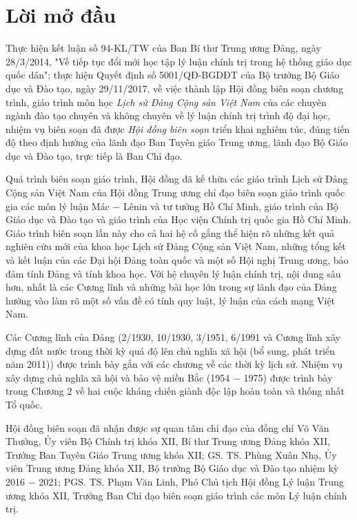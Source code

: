 \section*{Lời mở đầu}
Thực hiện kết luận số 94-KL/TW của Ban Bí thư Trung ương Đảng, ngày 28/3/2014, "Về tiếp tục đổi mới học tập lý luận chính trị trong hệ thống giáo dục quốc dân"; thực hiện Quyết định số 5001/QĐ-BGDĐT của Bộ trưởng Bộ Giáo dục và Đào tạo, ngày 29/11/2017, về việc thành lập Hội đồng biên soạn chương trình, giáo trình môn học \textit{Lịch sử Đảng Cộng sản Việt Nam} của các chuyên ngành đào tạo chuyên và không chuyên về lý luận chính trị trình độ đại học, nhiệm vụ biên soạn đã được \textit{Hội đồng biên soạn} triển khai nghiêm túc, đúng tiến độ theo định hướng của lãnh đạo Ban Tuyên giáo Trung ương, lãnh đạo Bộ Giáo dục và Đào tạo, trực tiếp là Ban Chỉ đạo.

Quá trình biên soạn giáo trình, Hội đồng đã kế thừa các giáo trình Lịch sử Đảng Cộng sản Việt Nam của Hội đồng Trung ương chỉ đạo biên soạn giáo trình quốc gia các môn lý luận Mác $-$ Lênin và tư tưởng Hồ Chí Minh, giáo trình của Bộ Giáo dục và Đào tạo và giáo trình của Học viện Chính trị quốc gia Hồ Chí Minh. Giáo trình biên soạn lần này cho cả hai hệ cố gắng thể hiện rõ những kết quả nghiên cứu mới của khoa học Lịch sử Đảng Cộng sản Việt Nam, những tổng kết và kết luận của các Đại hội Đảng toàn quốc và một số Hội nghị Trung ương, bảo đảm tính Đảng và tính khoa học. Với hệ chuyên lý luận chính trị, nội dung sâu hơn, nhất là các Cương lĩnh và những bài học lớn trong sự lãnh đạo của Đảng hướng vào làm rõ một số vấn đề có tính quy luật, lý luận của cách mạng Việt Nam.

Các Cương lĩnh của Đảng (2/1930, 10/1930, 3/1951, 6/1991 và Cương lĩnh xây dựng đất nước trong thời kỳ quá độ lên chủ nghĩa xã hội (bổ sung, phát triển năm 2011)) được trình bày gắn với các chương về các thời kỳ lịch sử. Nhiệm vụ xây dựng chủ nghĩa xã hội và bảo vệ miền Bắc (1954 $-$ 1975) được trình bày trong Chương 2 về hai cuộc kháng chiến giành độc lập hoàn toàn và thống nhất Tổ quốc.

Hội đồng biên soạn đã nhận được sự quan tâm chỉ đạo của đồng chí Võ Văn Thưởng, Ủy viên Bộ Chính trị khóa XII, Bí thư Trung ương Đảng khóa XII, Trưởng Ban Tuyên Giáo Trung ương khóa XII; GS. TS. Phùng Xuân Nhạ, Ủy viên Trung ương Đảng khóa XII, Bộ trưởng Bộ Giáo dục và Đào tạo nhiệm kỳ 2016 $-$ 2021; PGS. TS. Phạm Văn Linh, Phó Chủ tịch Hội đồng Lý luận Trung ương khóa XII, Trưởng Ban Chỉ đạo biên soạn giáo trình các môn Lý luận chính trị. 


